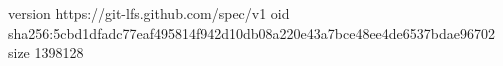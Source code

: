 version https://git-lfs.github.com/spec/v1
oid sha256:5cbd1dfadc77eaf495814f942d10db08a220e43a7bce48ee4de6537bdae96702
size 1398128
